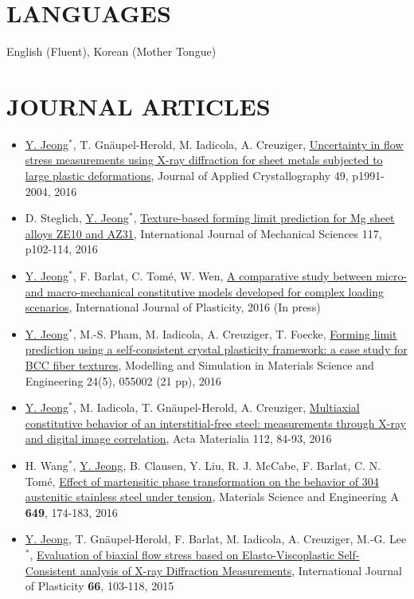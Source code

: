 \documentclass{res}
\begin{document}
\begin{resume}
  \section{LANGUAGES}
  English (Fluent), Korean (Mother Tongue)

  \section{JOURNAL ARTICLES}
  \begin{itemize}
  \item \underline{Y. Jeong}$^*$, T. Gn\"{a}upel-Herold, M. Iadicola, A. Creuziger, \href{https://doi.org/10.1107/S1600576716013662}{Uncertainty in flow stress measurements using X-ray diffraction for sheet metals subjected to large plastic deformations}, Journal of Applied Crystallography 49, p1991-2004, 2016
  \item D. Steglich, \underline{Y. Jeong}$^*$, \href{http://dx.doi.org/10.1016/j.ijmecsci.2016.08.013}{Texture-based forming limit prediction for Mg sheet alloys ZE10 and AZ31}, International Journal of Mechanical Sciences 117, p102-114, 2016
  \item \underline{Y. Jeong}$^*$, F. Barlat, C. Tom\'{e}, W. Wen, \href{http://dx.doi.org/10.1016/j.ijplas.2016.07.015}{A comparative study between micro- and macro-mechanical constitutive models developed for complex loading scenarios}, International Journal of Plasticity, 2016 (In press)
  \item \underline{Y. Jeong}$^*$, M.-S. Pham, M. Iadicola, A. Creuziger, T. Foecke, \href{http://dx.doi.org/10.1088/0965-0393/24/5/055005}{Forming limit prediction using a self-consistent crystal plasticity framework: a case study for BCC fiber textures}, Modelling and Simulation in Materials Science and Engineering 24(5), 055002 (21 pp), 2016
  \item \underline{Y. Jeong}$^*$, M. Iadicola, T. Gn\"{a}upel-Herold, A. Creuziger, \href{http://dx.doi.org/10.1016/j.actamat.2016.04.013}{Multiaxial constitutive behavior of an interstitial-free steel: measurements through X-ray and digital image correlation}, Acta Materialia 112, 84-93, 2016
  \item H. Wang$^*$, \underline{Y. Jeong}, B. Clausen, Y. Liu, R. J. McCabe, F. Barlat, C. N. Tom\'{e}, \href{http://dx.doi.org/10.1016/j.msea.2015.09.108}{Effect of martensitic phase transformation on the behavior of 304 austenitic stainless steel under tension}, Materials Science and Engineering A {\bf 649}, 174-183, 2016
  \item \underline{Y. Jeong}, T. Gn\"{a}upel-Herold, F. Barlat, M. Iadicola, A. Creuziger, M.-G. Lee$^*$, \href{http://dx.doi.org/10.1016/j.ijplas.2014.06.009}{Evaluation of biaxial flow stress based on Elasto-Viscoplastic Self-Consistent analysis of X-ray Diffraction Measurements}, International Journal of Plasticity {\bf 66}, 103-118, 2015

\end{itemize}
\end{resume}
\end{document}

